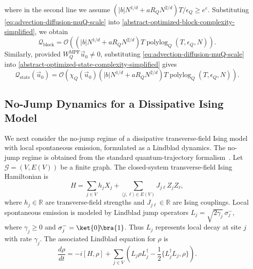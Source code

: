 \documentclass[10pt,reqno]{article}
\numberwithin{equation}{section}
\theoremstyle{plain}
\theoremstyle{definition}
\begin{document}
where in the second line we assume $  (|b|N^{1/d}+aR_QN^{2/d})T/\epsilon_Q \geq e^e$. Substituting \cref{eq:advection-diffusion-muQ-scale} into \cref{abstract-optimized-block-complexity-simplified}, we obtain
\begin{equation}\label{eq:advection-diffusion-block-complexity-final}
\mathcal Q_{\operatorname{block}} = \mathcal O ( ( |b|N^{1/d} + aR_QN^{2/d} ) T \operatorname{polylog}_Q(T,\epsilon_Q,N) ).
\end{equation}
Similarly, provided \(W_Q^{\operatorname{MPF}}\vec u_0\neq0\), substituting \cref{eq:advection-diffusion-muQ-scale} into \cref{abstract-optimized-state-complexity-simplified} gives
\begin{equation}\label{eq:advection-diffusion-state-complexity-final}
\mathcal Q_{\operatorname{state}}(\vec u_0) = \mathcal O ( \chi_Q(\vec u_0) ( |b|N^{1/d} + aR_QN^{2/d} ) T \operatorname{polylog}_Q(T,\epsilon_Q,N) ).
\end{equation}

\subsection{No-Jump Dynamics for a Dissipative Ising Model}
\label{sec:no-jump-tfim}
We next consider the no-jump regime of a dissipative transverse-field Ising model with local spontaneous emission, formulated as a Lindblad dynamics. The no-jump regime is obtained from the standard quantum-trajectory formalism~\cite{DalibardCastinMolmer1992,PlenioKnight1998,LeeChan2013,RobertsClerk2023}. Let \(\mathcal G=(V,E(V))\) be a finite graph. The closed-system transverse-field Ising Hamiltonian is 
\begin{equation}\label{eq:tfim-hamiltonian}
H = \sum_{j\in V} h_j X_j + \sum_{\langle j,\ell\rangle\in E(V)} J_{j\ell} Z_j Z_\ell,
\end{equation}
where \(h_j \in \mathbb{R}\) are transverse-field strengths and \(J_{j\ell} \in \mathbb{R}\) are Ising couplings. Local spontaneous emission is modeled by Lindblad jump operators \(L_j=\sqrt{2\gamma_j}\,\sigma_j^-\), where \(\gamma_j\geq0\) and \(\sigma_j^-=\ket{0}\!\bra{1}\). Thus \(L_j\) represents local decay at site \(j\) with rate \(\gamma_j\). The associated Lindblad equation for \(\rho\) is
\begin{equation}\label{eq:tfim-lindblad}
\frac{d\rho}{dt} = -i[H,\rho] + \sum_{j\in V} ( L_j\rho L_j^\dagger - \frac12\{L_j^\dagger L_j,\rho\} ).
\end{equation}
\end{document}
